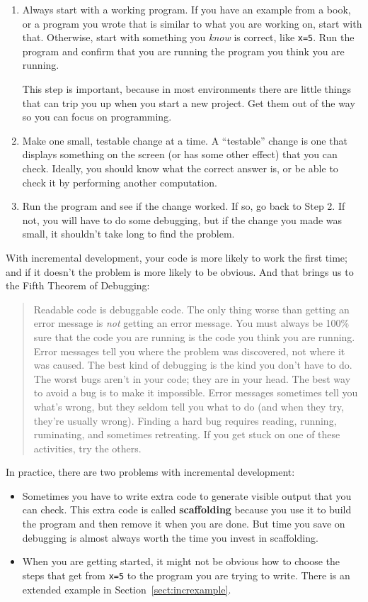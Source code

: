 \documentclass[
]{book}
\numberwithin{Answer}{chapter}
\numberwithin{Exercise}{chapter}
\newcommand{\displaythrm}[1]{%
    \ifthenelse{\equal{#1}{1}}%
        {Readable code is debuggable code.}{%
    \ifthenelse{\equal{#1}{2}}%
        {The only thing worse than getting an error message is {\em
         not} getting an error message.}{%
    \ifthenelse{\equal{#1}{3}}%
        {You must always be 100\% sure that the code you are running
         is the code you think you are running.}{%
    \ifthenelse{\equal{#1}{4}}%
        {Error messages tell you where the problem was discovered,
         not where it was caused.}{%
    \ifthenelse{\equal{#1}{5}}%
        {The best kind of debugging is the kind you don't have to do.}{%
    \ifthenelse{\equal{#1}{6}}%
        {The worst bugs aren't in your code; they are in your head.}{%
    \ifthenelse{\equal{#1}{7}}%
        {The best way to avoid a bug is to make it impossible.}{%
    \ifthenelse{\equal{#1}{8}}%
        {Error messages sometimes tell you what's wrong, but they
         seldom tell you what to do (and when they try, they're usually
         wrong).}{%
    \ifthenelse{\equal{#1}{9}}%
        {Finding a hard bug requires reading, running, ruminating,
         and sometimes retreating.  If you get stuck on one of these
         activities, try the others.}{%
    {}%
}}}}}}}}}}%
\begin{document}
\begin{enumerate}

\item Always start with a working program.  If you have an
example from a book, or a program you wrote that is similar to
what you are working on, start with that.  Otherwise, start with
something you {\em know} is correct, like {\tt x=5}.  Run the program
and confirm that you are running the program you think you are
running.

This step is important, because in most environments there
are little things that can trip you up when you start a new
project.  Get them out of the way so you can focus on programming.

\item Make one small, testable change at a time.  A ``testable''
change is one that displays something on the screen (or has some
other effect) that you can check.  Ideally, you should know what
the correct answer is, or be able to check it by performing another
computation.

\item Run the program and see if the change worked.  If so, go back
to Step 2.  If not, you will have to do some debugging, but if the
change you made was small, it shouldn't take long to find the problem.

\end{enumerate}

With incremental development, your code is more likely to work the first time; and if it doesn't the problem is more likely to be obvious.  And that brings us to the Fifth Theorem of Debugging:

\begin{quote}
\displaythrm{5}
\end{quote}

In practice, there are two problems with incremental development:

\begin{itemize}

\item Sometimes you have to write extra code to
generate visible output that you can check.  This extra code is
called {\bf scaffolding} because you use it to build the program
and then remove it when you are done.  But time you save on
debugging is almost always worth the time you invest in
scaffolding.

\item When you are getting started, it might not be obvious how to
choose the steps that get from {\tt x=5} to the program you are trying
to write.  There is an extended example in Section~\ref{sect:increxample}.

\end{itemize}
\end{document}
